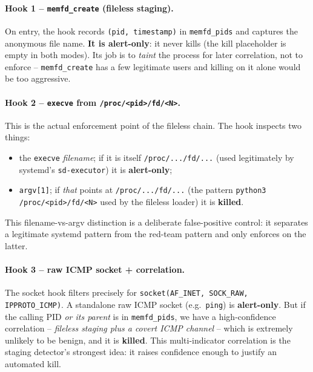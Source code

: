 \documentclass[11pt]{article}
\newcommand{\co}[1]{\texttt{#1}}
\begin{document}
\paragraph{Hook 1 -- \co{memfd\_create} (fileless staging).}
On entry, the hook records \co{(pid, timestamp)} in \co{memfd\_pids} and
captures the anonymous file name. \textbf{It is alert-only}: it never kills
(the kill placeholder is empty in both modes). Its job is to \emph{taint}
the process for later correlation, not to enforce -- \co{memfd\_create} has a
few legitimate users and killing on it alone would be too aggressive.

\paragraph{Hook 2 -- \co{execve} from \co{/proc/<pid>/fd/<N>}.}
This is the actual enforcement point of the fileless chain. The hook
inspects two things:
\begin{itemize}[leftmargin=1.4em]
  \item the \co{execve} \emph{filename}; if it is itself \co{/proc/.../fd/...}
        (used legitimately by systemd's \co{sd-executor}) it is
        \textbf{alert-only};
  \item \co{argv[1]}; if \emph{that} points at \co{/proc/.../fd/...}
        (the pattern \co{python3 /proc/<pid>/fd/<N>} used by the fileless
        loader) it is \textbf{killed}.
\end{itemize}
This filename-vs-argv distinction is a deliberate false-positive control: it
separates a legitimate systemd pattern from the red-team pattern and only
enforces on the latter.

\paragraph{Hook 3 -- raw ICMP socket + correlation.}
The socket hook filters precisely for
\co{socket(AF\_INET, SOCK\_RAW, IPPROTO\_ICMP)}. A standalone raw ICMP
socket (e.g.\ \co{ping}) is \textbf{alert-only}. But if the calling PID
\emph{or its parent} is in \co{memfd\_pids}, we have a high-confidence
correlation -- \emph{fileless staging plus a covert ICMP channel} -- which is
extremely unlikely to be benign, and it is \textbf{killed}. This
multi-indicator correlation is the staging detector's strongest idea: it raises
confidence enough to justify an automated kill.
\end{document}
